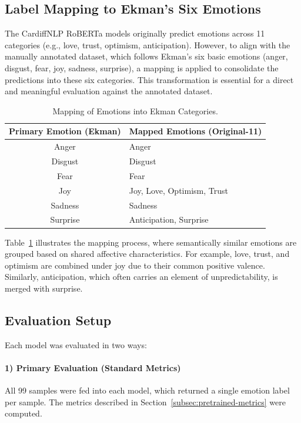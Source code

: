 \subsection{Label Mapping to Ekman’s Six Emotions}
\label{subsubsec:ekman}

The CardiffNLP RoBERTa models originally predict emotions across 11 categories (e.g., love, trust, optimism, anticipation). However, to align with the manually annotated dataset, which follows Ekman’s six basic emotions (anger, disgust, fear, joy, sadness, surprise), a mapping is applied to consolidate the predictions into these six categories. This transformation is essential for a direct and meaningful evaluation against the annotated dataset.
\newline

\begin{table}[ht]
    \centering
    \begin{tabular}{|c|l|}
        \hline
        \textbf{Primary Emotion (Ekman)} & \textbf{Mapped Emotions (Original-11)} \\
        \hline
        Anger     & Anger \\
        Disgust   & Disgust \\
        Fear      & Fear \\
        Joy       & Joy, Love, Optimism, Trust \\
        Sadness   & Sadness \\
        Surprise  & Anticipation, Surprise \\
        \hline
    \end{tabular}
    \caption{Mapping of Emotions into Ekman Categories.}
    \label{tab:emotion_mapping}
\end{table}

Table~\ref{tab:emotion_mapping} illustrates the mapping process, where semantically similar emotions are grouped based on shared affective characteristics. For example, love, trust, and optimism are combined under joy due to their common positive valence. Similarly, anticipation, which often carries an element of unpredictability, is merged with surprise.


\subsection{Evaluation Setup}
\label{subsec:eval}

Each model was evaluated in two ways:

\paragraph{1) Primary Evaluation (Standard Metrics)} 
All 99 samples were fed into each model, which returned a single emotion label per sample. The metrics described in Section~\ref{subsec:pretrained-metrics} were computed.

